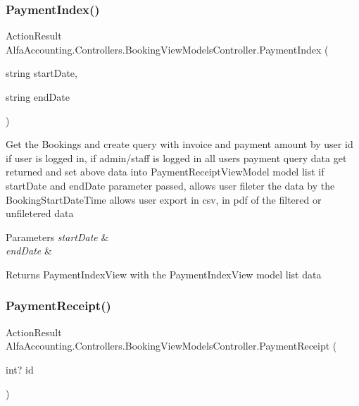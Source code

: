 \subsubsection{\texorpdfstring{Payment\+Index()}{PaymentIndex()}}
{\footnotesize\ttfamily Action\+Result Alfa\+Accounting.\+Controllers.\+Booking\+View\+Models\+Controller.\+Payment\+Index (\begin{DoxyParamCaption}\item[{string}]{start\+Date,  }\item[{string}]{end\+Date }\end{DoxyParamCaption})}



Get the Bookings and create query with invoice and payment amount by user id if user is logged in, if admin/staff is logged in all user\textquotesingle{}s payment query data get returned and set above data into Payment\+Receipt\+View\+Model model list if start\+Date and end\+Date parameter passed, allows user fileter the data by the Booking\+Start\+Date\+Time allows user export in csv, in pdf of the filtered or unfiletered data 


\begin{DoxyParams}{Parameters}
{\em start\+Date} & \\
\hline
{\em end\+Date} & \\
\hline
\end{DoxyParams}
\begin{DoxyReturn}{Returns}
Payment\+Index\+View with the Payment\+Index\+View model list data
\end{DoxyReturn}
\mbox{\label{class_alfa_accounting_1_1_controllers_1_1_booking_view_models_controller_ac228b95707fb10fe6aca1e4cacc2be6d}} 
\subsubsection{\texorpdfstring{Payment\+Receipt()}{PaymentReceipt()}}
{\footnotesize\ttfamily Action\+Result Alfa\+Accounting.\+Controllers.\+Booking\+View\+Models\+Controller.\+Payment\+Receipt (\begin{DoxyParamCaption}\item[{int?}]{id }\end{DoxyParamCaption})}




